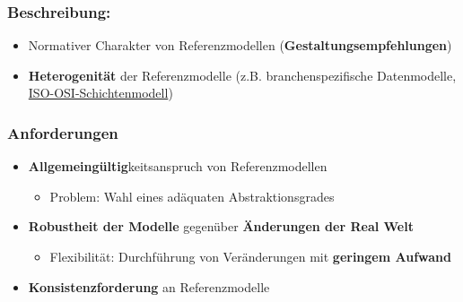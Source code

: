 \documentclass[a4paper]{article}
\newcommand{\tabitem}{~~\llap{\textbullet}~~}
\begin{document}
			\subsubsection{Beschreibung:}
			\begin{itemize}
				\item Normativer Charakter von Referenzmodellen (\textbf{Gestaltungsempfehlungen})
				\item \textbf{Heterogenität} der Referenzmodelle (z.B. branchenspezifische Datenmodelle, \hyperref{https://en.wikipedia.org/wiki/OSI_model}{}{}{ISO-OSI-Schichtenmodell})
			\end{itemize}
			
			\subsubsection{Anforderungen}
			\begin{itemize}
				\item \textbf{Allgemeingültig}keitsanspruch von Referenzmodellen
				\begin{itemize}
					\item Problem: Wahl eines adäquaten Abstraktionsgrades
				\end{itemize}
				\item \textbf{Robustheit der Modelle} gegenüber \textbf{Änderungen der Real Welt}
				\begin{itemize}
					\item Flexibilität: Durchführung von Veränderungen mit \textbf{geringem Aufwand}
				\end{itemize}
				\item \textbf{Konsistenzforderung} an Referenzmodelle
			\end{itemize}
			
\end{document}
